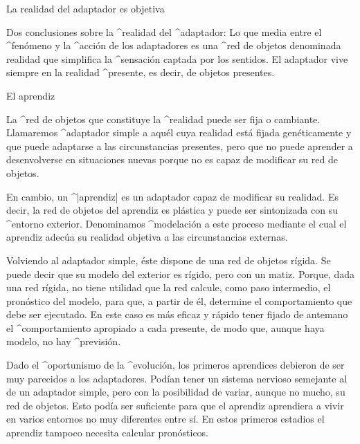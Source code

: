 \Section La realidad del adaptador es objetiva

Dos conclusiones sobre la ^{realidad} del ^{adaptador}:
\beginpoints
\point Lo que media entre el ^{fenómeno} y la ^{acción} de los
adaptadores es una ^{red de objetos} denominada realidad que simplifica
la ^{sensación} captada por los sentidos.
\point El adaptador vive siempre en la realidad ^{presente}, es decir, de
objetos presentes.
\endpoints


\Section El aprendiz

La ^{red de objetos} que constituye la ^{realidad} puede ser fija o
cambiante. Llamaremos ^{adaptador simple} a aquél cuya realidad está
fijada genéticamente y que puede adaptarse a las circunstancias
presentes, pero que no puede aprender a desenvolverse en situaciones
nuevas porque no es capaz de modificar su red de objetos.

En cambio, un ^|aprendiz| es un adaptador capaz de modificar su
realidad. Es decir, la red de objetos del aprendiz es plástica y puede
ser sintonizada con su ^{entorno} exterior. Denominamos ^{modelación} a
este proceso mediante el cual el aprendiz adecúa su realidad objetiva a
las circunstancias externas.

Volviendo al adaptador simple, éste dispone de una red de objetos
rígida. Se puede decir que su modelo del exterior es rígido, pero con un
matiz. Porque, dada una red rígida, no tiene utilidad que la red
calcule, como paso intermedio, el pronóstico del modelo, para que, a
partir de él, determine el comportamiento que debe ser ejecutado. En
este caso es más eficaz y rápido tener fijado de antemano el
^{comportamiento} apropiado a cada presente, de modo que, aunque haya
modelo, no hay ^{previsión}.

Dado el ^{oportunismo} de la ^{evolución}, los primeros aprendices
debieron de ser muy parecidos a los adaptadores. Podían tener un sistema
nervioso semejante al de un adaptador simple, pero con la posibilidad de
variar, aunque no mucho, su red de objetos. Esto podía ser suficiente
para que el aprendiz aprendiera a vivir en varios entornos no muy
diferentes entre sí. En estos primeros estadios el aprendiz tampoco
necesita calcular pronósticos.

